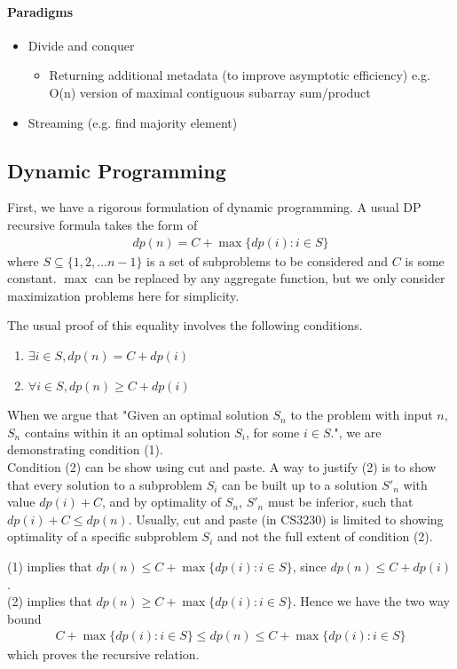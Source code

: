 \documentclass{article}
\begin{document}
\paragraph{Paradigms}
\begin{itemize}
	\item Divide and conquer
	\begin{itemize}
		\item Returning additional metadata (to improve asymptotic efficiency) e.g. O(n) version of maximal contiguous subarray sum/product
	\end{itemize}
	\item Streaming (e.g. find majority element)
\end{itemize}


\subsection{Dynamic Programming}
First, we have a rigorous formulation of dynamic programming. A usual DP recursive formula takes the form of 
\begin{align*}
	dp(n) = C + \max \{dp(i) : i\in S\}
\end{align*}
where $S\subseteq \{1,2,\dots n-1\}$ is a set of subproblems to be considered and $C$ is some constant. $\max$ can be replaced by any aggregate function, but we only consider maximization problems here for simplicity.

The usual proof of this equality involves the following conditions.
\begin{enumerate}
	\item $\exists i\in S, dp(n) = C + dp(i)$
	\item $\forall i\in S, dp(n)\geq C + dp(i)$
\end{enumerate}
When we argue that "Given an optimal solution $S_n$ to the problem with input $n$, $S_n$ contains within it an optimal solution $S_i$, for some $i\in S$.", we are demonstrating condition (1).\\
Condition (2) can be show using cut and paste. A way to justify (2) is to show that every solution to a subproblem $S_i$ can be built up to a solution $S'_n$ with value $dp(i) + C$, and by optimality of $S_n$, $S'_n$ must be inferior, such that $dp(i) + C\leq dp(n)$. Usually, cut and paste (in CS3230) is limited to showing optimality of a specific subproblem $S_i$ and not the full extent of condition (2).

(1) implies that $dp(n)\leq C + \max \{dp(i) : i\in S\}$, since $dp(n)\leq C + dp(i)$.\\
(2) implies that $dp(n)\geq C + \max \{dp(i) : i\in S\}$.
Hence we have the two way bound
\begin{align*}
	C + \max \{dp(i) : i\in S\}\leq dp(n)\leq C + \max \{dp(i) : i\in S\}
\end{align*}
which proves the recursive relation.
\end{document}
